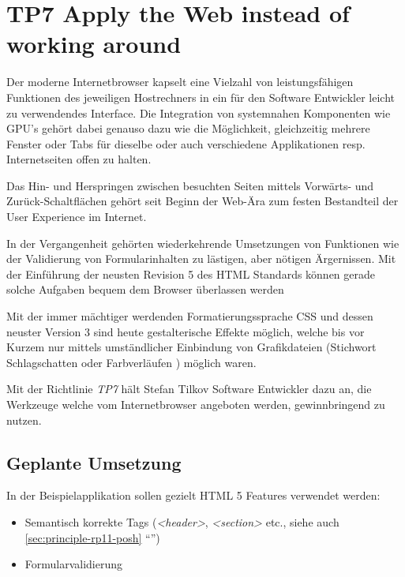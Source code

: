 \section{TP7 Apply the Web instead of working around}
\label{sec:principle-tp7-apply-the-web}

Der moderne Internetbrowser kapselt eine Vielzahl von leistungsfähigen Funktionen des jeweiligen Hostrechners in ein für den Software Entwickler leicht zu verwendendes Interface. Die Integration von systemnahen Komponenten wie \gls{GPU}'s \cite{webgl} gehört dabei genauso dazu wie die Möglichkeit, gleichzeitig mehrere Fenster oder Tabs für dieselbe oder auch verschiedene Applikationen resp. Internetseiten offen zu halten.

Das Hin- und Herspringen zwischen besuchten Seiten mittels Vorwärts- und Zurück-Schaltflächen gehört seit Beginn der Web-Ära zum festen Bestandteil der User Experience im Internet.

In der Vergangenheit gehörten wiederkehrende Umsetzungen von Funktionen wie der Validierung von Formularinhalten zu lästigen, aber nötigen Ärgernissen. Mit der Einführung der neusten Revision 5 des HTML Standards können gerade solche Aufgaben bequem dem Browser \cite{HTML5Forms} überlassen werden

Mit der immer mächtiger werdenden Formatierungssprache CSS und dessen neuster Version 3 sind heute gestalterische Effekte möglich, welche bis vor Kurzem nur mittels umständlicher Einbindung von Grafikdateien (Stichwort Schlagschatten \cite{css-box-shadow} oder Farbverläufen \cite{css-gradient}) möglich waren.

Mit der Richtlinie \emph{TP7} hält Stefan Tilkov Software Entwickler dazu an, die Werkzeuge welche vom Internetbrowser angeboten werden, gewinnbringend zu nutzen.


\subsection*{Geplante Umsetzung}

In der Beispielapplikation sollen gezielt HTML 5 Features verwendet werden:

\begin{itemize}
	\item Semantisch korrekte Tags (\emph{<header>}, \emph{<section>} etc., siehe auch \ref{sec:principle-rp11-posh} ``'')
	\item Formularvalidierung \cite{HTML5Forms}
\end{itemize}

